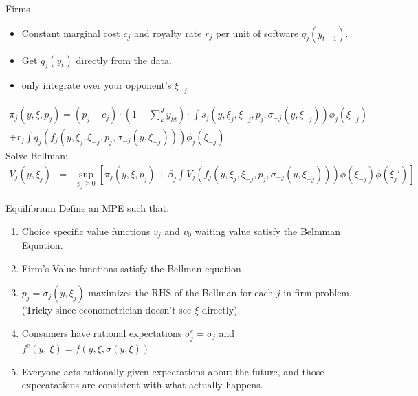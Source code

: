 \documentclass[aspectratio=169,11pt]{beamer}
\begin{document}
\begin{frame}{Firms}
\begin{itemize}
\item Constant marginal cost $c_j$ and royalty rate $r_j$ per unit of software $q_j(y_{t+1})$.
\item Get $q_j(y_t)$ directly from the data.
\item only integrate over your opponent's $\xi_{-j}$
\end{itemize}
\small
\begin{eqnarray*} \pi_j(y,\xi,p_j) = (p_j - c_j) \cdot (1-\sum_k^{J} y_{kt}) \cdot \int s_j(y,\xi_j,\xi_{-j},p_j,\sigma_{-j}(y,\xi_{-j})) \phi_j(\xi_{-j}) \\
+ r_j \int q_j(f_j(y,\xi_j,\xi_{-j},p_j,\sigma_{-j}(y,\xi_{-j}))) \phi_j(\xi_{-j})
\end{eqnarray*}
Solve Bellman:
\begin{eqnarray*} 
V_j(y,\xi_j) &=& \sup_{p_j \geq 0} \left[ \pi_j(y,\xi,p_j) +\beta_f \int V_j(f_j(y,\xi_j,\xi_{-j},p_j,\sigma_{-j}(y,\xi_{-j}))) \phi(\xi_{-j}) \phi(\xi_j') \right]
\end{eqnarray*}


\end{frame}


\begin{frame}{Equilibrium}
Define an MPE such that:
\begin{enumerate}
\item Choice specific value functions $v_j$ and $v_0$ waiting value satisfy the Belmman Equation.
\item Firm's Value functions satisfy the Bellman equation
\item $p_j = \sigma_j(y,\xi_j)$ maximizes the RHS of the Bellman for each $j$ in firm problem. (Tricky since econometrician doesn't see $\xi$ directly).
\item Consumers have rational expectations $\sigma^e_j = \sigma_j$ and $f^e(y,\
\xi) = f(y,\xi,\sigma(y,\xi))$ 
\item Everyone acts rationally given expectations about the future, and those expecatations are consistent with what actually happens.
\end{enumerate}
\end{frame}
\end{document}
